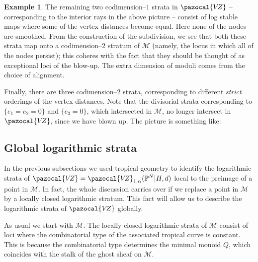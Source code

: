 \documentclass[11pt]{amsart}
\newcommand{\PP}{\mathbb P}
\newcommand{\VZ}{\pazocal{V\!Z}}
\newcommand{\Mcal}{\mathcal{M}}
\theoremstyle{definition}
\theoremstyle{definition}
\newtheorem{example}[thm]{Example}
\begin{document}
\begin{example}
The remaining two codimension--$1$ strata in $\VZ$ -- corresponding to the interior rays in the above picture -- consist of log stable maps where some of the vertex distances become equal. Here none of the nodes are smoothed. From the construction of the subdivision, we see that both these strata map onto a codimension--$2$ stratum of $\Mcal$ (namely, the locus in which all of the nodes persist); this coheres with the fact that they should be thought of as exceptional loci of the blow-up. The extra dimension of moduli comes from the choice of alignment.

Finally, there are three codimension--$2$ strata, corresponding to different \emph{strict} orderings of the vertex distances. Note that the divisorial strata corresponding to $\{e_1=e_2=0\}$ and $\{e_3=0\}$, which intersected in $\Mcal$, no longer intersect in $\VZ$, since we have blown up. The picture is something like:
\begin{center}
\end{center}

\end{example}

\subsection{Global logarithmic strata}
In the previous subsections we used tropical geometry to identify the logarithmic strata of $\VZ=\VZ_{1,\alpha}(\PP^N|H,d)$ local to the preimage of a point in $\Mcal$. In fact, the whole discussion carries over if we replace a point in $\Mcal$ by a locally closed logarithmic stratum. This fact will allow us to describe the logarithmic strata of $\VZ$ globally.

As usual we start with $\Mcal$. The locally closed logarithmic strata of $\Mcal$ consist of loci where the combinatorial type of the associated tropical curve is constant. This is because the combinatorial type determines the minimal monoid $Q$, which coincides with the stalk of the ghost sheaf on $\Mcal$.
\end{document}
